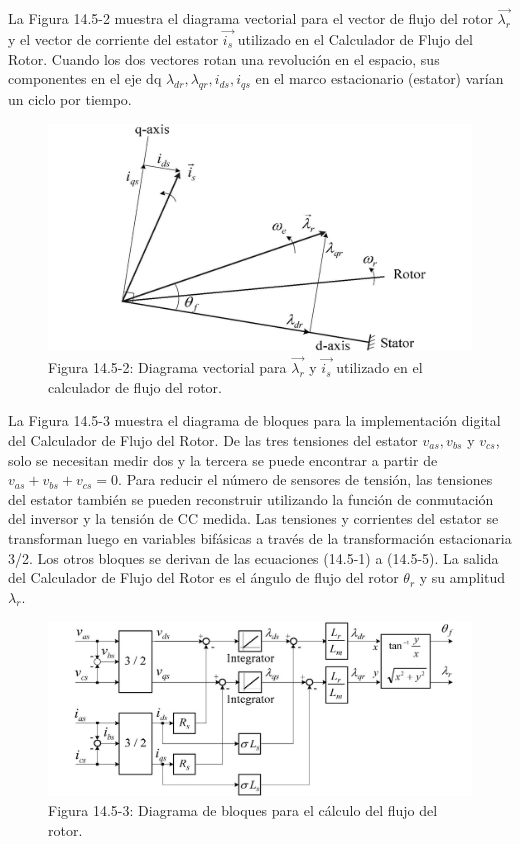 \documentclass[letterpaper,12pt]{article} %
\begin{document}
La Figura 14.5-2 muestra el diagrama vectorial para el vector de flujo del rotor \( \vec{\lambda_r} \) y el vector de corriente del estator \( \vec{i_s} \) utilizado en el Calculador de Flujo del Rotor. Cuando los dos vectores rotan una revolución en el espacio, sus componentes en el eje dq \( \lambda_{dr}, \lambda_{qr}, i_{ds}, i_{qs} \) en el marco estacionario (estator) varían un ciclo por tiempo.

\begin{figure}[ht]
    \centering
    \includegraphics{graficos/img14.jpg} 
    \caption{Figura 14.5-2: Diagrama vectorial para \( \vec{\lambda_r} \) y \( \vec{i_s} \) utilizado en el calculador de flujo del rotor.}
    \label{fig:14.5-2}
\end{figure}
\FloatBarrier

La Figura 14.5-3 muestra el diagrama de bloques para la implementación digital del Calculador de Flujo del Rotor. De las tres tensiones del estator \( v_{as}, v_{bs} \) y \( v_{cs} \), solo se necesitan medir dos y la tercera se puede encontrar a partir de \( v_{as} + v_{bs} + v_{cs} = 0 \). Para reducir el número de sensores de tensión, las tensiones del estator también se pueden reconstruir utilizando la función de conmutación del inversor y la tensión de CC medida. Las tensiones y corrientes del estator se transforman luego en variables bifásicas a través de la transformación estacionaria 3/2. Los otros bloques se derivan de las ecuaciones (14.5-1) a (14.5-5). La salida del Calculador de Flujo del Rotor es el ángulo de flujo del rotor \( \theta_r \) y su amplitud \( \lambda_r \).

\begin{figure}[ht]
    \centering
    \includegraphics{graficos/img15.jpg} 
    \caption{Figura 14.5-3: Diagrama de bloques para el cálculo del flujo del rotor.}
    \label{fig:14.5-3}
\end{figure}
\FloatBarrier
\end{document}

